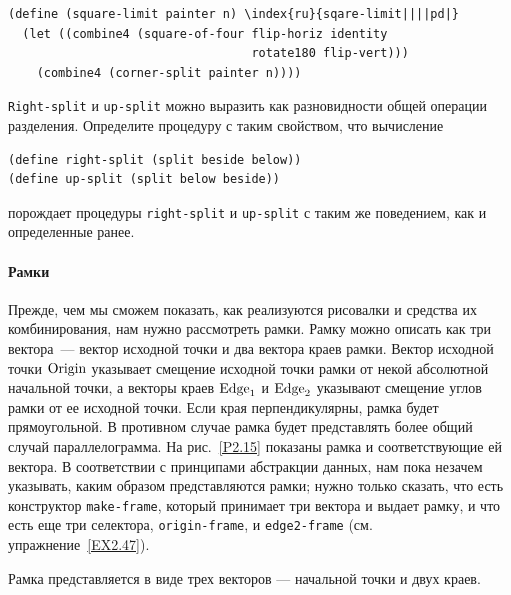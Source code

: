 \begin{Verbatim}[fontsize=\small]
(define (square-limit painter n) \index{ru}{sqare-limit||||pd|}
  (let ((combine4 (square-of-four flip-horiz identity
                                  rotate180 flip-vert)))
    (combine4 (corner-split painter n))))
\end{Verbatim}
\begin{exercise}{2.45}\label{EX2.45}%
{\tt Right-split} и {\tt up-split} можно
выразить как разновидности общей операции разделения.  Определите
процедуру   с таким свойством, что вычисление

\begin{Verbatim}[fontsize=\small]
(define right-split (split beside below))
(define up-split (split below beside))
\end{Verbatim}
порождает процедуры {\tt right-split} и {\tt up-split} с 
таким же поведением, как и определенные ранее.
\end{exercise}

\paragraph{Рамки}

Прежде, чем мы сможем показать, как реализуются рисовалки 
и средства их комбинирования, нам нужно рассмотреть рамки.
Рамку можно описать как три вектора~--- вектор исходной точки и два вектора
краев рамки.  Вектор исходной точки $\mbox{\rm Origin}$ указывает смещение исходной точки 
рамки от некой абсолютной начальной точки, а векторы краев
$\mbox{\rm Edge}_1$ и $\mathop{\rm Edge}_2$
указывают смещение углов рамки от ее исходной точки.  Если края
перпендикулярны, рамка будет прямоугольной.  В противном случае рамка
будет представлять более общий случай параллелограмма.
На рис.~\ref{P2.15} показаны рамка и
соответствующие ей вектора.  В соответствии с принципами абстракции
данных, нам пока незачем указывать, каким образом представляются
рамки; нужно только сказать, что есть конструктор
{\tt make-frame},
который принимает три вектора и выдает рамку, 
и что есть еще три селектора, {\tt origin-frame},
и {\tt edge2-frame}
(см. упражнение~\ref{EX2.47}).


\begin{cntrfig}

\caption{Рамка представляется в виде трех векторов 
--- начальной точки и двух краев.}
\label{P2.15}

\end{cntrfig}

